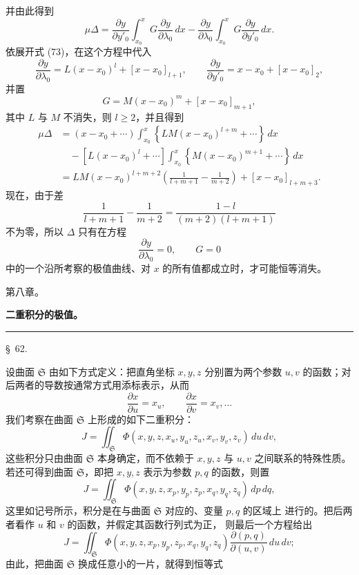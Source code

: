 \documentclass[11pt,a4paper,leqno]{article}
\begin{document}
并由此得到
\[
\mu\Delta=
\frac{\partial y}{\partial y'_0}
\int_{x_0}^{x}G\frac{\partial y}{\partial\lambda_0}\,dx
-\frac{\partial y}{\partial\lambda_0}
\int_{x_0}^{x}G\frac{\partial y}{\partial y'_0}\,dx.
\]
依展开式 (73)，在这个方程中代入
\[
\frac{\partial y}{\partial\lambda_0}
=L(x-x_0)^l+[x-x_0]_{l+1},\qquad
\frac{\partial y}{\partial y'_0}=x-x_0+[x-x_0]_2,
\]
并置
\[
G=M(x-x_0)^m+[x-x_0]_{m+1},
\]
其中 $L$ 与 $M$ 不消失，则 $l\geq 2$，并且得到
\[
\begin{aligned}
\mu\Delta
&=(x-x_0+\cdots)
\int_{x_0}^{x}\left\{LM(x-x_0)^{l+m}+\cdots\right\}\,dx\\
&\quad-[L(x-x_0)^l+\cdots]
\int_{x_0}^{x}\left\{M(x-x_0)^{m+1}+\cdots\right\}\,dx\\
&=LM(x-x_0)^{l+m+2}
\left(\frac{1}{l+m+1}-\frac{1}{m+2}\right)
+[x-x_0]_{l+m+3}.
\end{aligned}
\]
现在，由于差
\[
\frac{1}{l+m+1}-\frac{1}{m+2}
=\frac{1-l}{(m+2)(l+m+1)}
\]
不为零，所以 $\Delta$ 只有在方程
\[
\frac{\partial y}{\partial\lambda_0}=0,\qquad G=0
\]
中的一个沿所考察的极值曲线、对 $x$ 的所有值都成立时，才可能恒等消失。

\begin{center}
{\large 第八章。}\par\vspace{1.5em}
{\Large\bfseries 二重积分的极值。}\par\vspace{1.4em}
\rule{2.4cm}{0.4pt}\par\vspace{1.5em}
{\large \S~62.}
\end{center}

设曲面 $\mathfrak{S}$ 由如下方式定义：把直角坐标 $x,y,z$ 分别置为两个参数
$u,v$ 的函数；对后两者的导数按通常方式用添标表示，从而
\[
\frac{\partial x}{\partial u}=x_u,
\qquad
\frac{\partial x}{\partial v}=x_v,\ldots
\]
我们考察在曲面 $\mathfrak{S}$ 上形成的如下二重积分：
\[
J=\iint_{\mathfrak{S}}
\Phi(x,y,z,x_u,y_u,z_u,x_v,y_v,z_v)\,du\,dv,
\]
这些积分只由曲面 $\mathfrak{S}$ 本身确定，而不依赖于 $x,y,z$ 与 $u,v$
之间联系的特殊性质。若还可得到曲面 $\mathfrak{S}$，即把 $x,y,z$ 表示为参数
$p,q$ 的函数，则置
\[
J=\iint_{\mathfrak{S}}
\Phi(x,y,z,x_p,y_p,z_p,x_q,y_q,z_q)\,dp\,dq,
\]
这里如记号所示，积分是在与曲面 $\mathfrak{S}$ 对应的、变量 $p,q$ 的区域上
进行的。把后两者看作 $u$ 和 $v$ 的函数，并假定其函数行列式为正，
则最后一个方程给出
\[
J=\iint_{\mathfrak{S}}
\Phi(x,y,z,x_p,y_p,z_p,x_q,y_q,z_q)
\frac{\partial(p,q)}{\partial(u,v)}\,du\,dv;
\]
由此，把曲面 $\mathfrak{S}$ 换成任意小的一片，就得到恒等式
\end{document}

